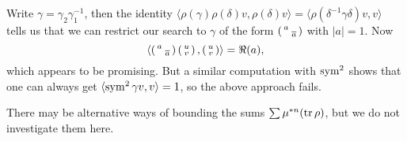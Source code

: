 Write $\gamma = \gamma_2 \gamma_1^{-1}$, then the identity 
$\langle \rho(\gamma)\rho(\delta)v,\rho(\delta)v\rangle = \langle \rho(\delta^{-1} \gamma\delta) v,v\rangle$ tells us that we can restrict our search to 
$\gamma$ of the form $\left(\begin{smallmatrix} a &  \\  & \overline a \end{smallmatrix}\right)$ with $|a|=1$. Now 
\[
	\left\langle \left(\begin{smallmatrix} a &  \\  & \overline a \end{smallmatrix}\right) \left(\begin{smallmatrix} u \\ v \end{smallmatrix} \right), \left(\begin{smallmatrix} u \\ v \end{smallmatrix} \right)\right\rangle = \Re(a) ,
\]
which appears to be promising. But a similar computation with $\operatorname{sym}^2$ shows 
that one can always get $\langle \operatorname{sym}^2 \gamma  v,v\rangle = 1$, so the above 
approach fails. 

There may be alternative ways of bounding the sums $\sum\mu^{\ast n}(\operatorname{tr}\rho)$, 
but we do not investigate them here. 
